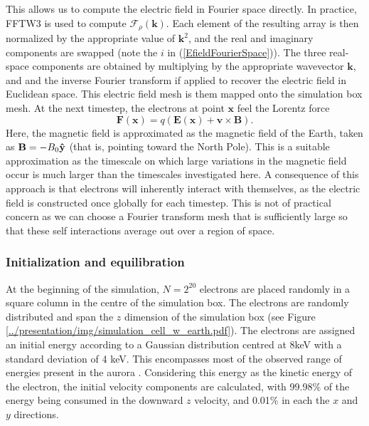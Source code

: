 \documentclass[twocolumn]{article}
\renewcommand{\vec}[1]{\mathbf{#1} }
\begin{document}
This allows us to compute the electric field in Fourier space directly. In practice, FFTW3\cite{FFTW05} is used to compute $\mathcal{F}_\rho(\vec k)$.  Each element of the resulting array is then normalized by the appropriate value of $\vec k^2$, and the real and imaginary components are swapped (note the $i$ in (\ref{EfieldFourierSpace})).  The three real-space components are obtained by multiplying by the appropriate wavevector $\vec k$, and and the inverse Fourier transform if applied to recover the electric field in Euclidean space. This electric field mesh is them mapped onto the simulation box mesh.  At the next timestep, the electrons at point $\vec x$ feel the Lorentz force
\begin{equation*}
\vec F(\vec x) = q(\vec E(\vec x) + \vec v \times \vec B).
\end{equation*}
Here, the magnetic field is approximated as the magnetic field of the Earth, taken as $\vec B = -B_0\yhat$ (that is, pointing toward the North Pole).  This is a suitable approximation as the timescale on which large variations in the magnetic field occur is much larger than the timescales investigated here.\cite{Courtillot1988}  A consequence of this approach is that electrons will inherently interact with themselves, as the electric field is constructed once globally for each timestep. This is not of practical concern as we can choose a Fourier transform mesh that is sufficiently large so that these self interactions average out over a region of space.

\subsubsection*{Initialization and equilibration}

At the beginning of the simulation, $N=2^{20}$ electrons are placed randomly in a square column in the centre of the simulation box. The electrons are randomly distributed and span the $z$ dimension of the simulation box (see Figure \ref{../presentation/img/simulation_cell_w_earth.pdf}).  The electrons are assigned an initial energy according to a Gaussian distribution centred at 8keV with a standard deviation of 4 keV. This encompasses most of the observed range of energies present in the aurora \cite{Sandahl2008}.  Considering this energy as the kinetic energy of the electron, the initial velocity components are calculated, with 99.98\% of the energy being consumed in the downward $z$ velocity, and 0.01\% in each the $x$ and $y$ directions.
\end{document}
